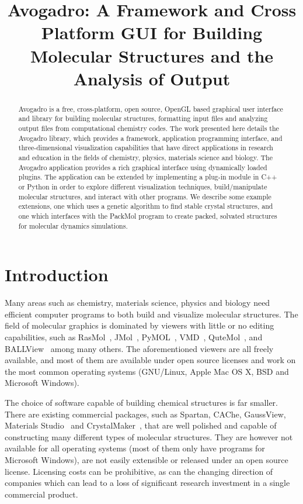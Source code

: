 \documentclass{article}
\title{Avogadro: A Framework and Cross Platform GUI for Building Molecular Structures and the Analysis of Output}
\begin{document}
\maketitle

\begin{abstract}

Avogadro is a free, cross-platform, open source, OpenGL based graphical user
interface and library for building molecular structures, formatting input files
and analyzing output files from computational chemistry codes. The work
presented here details the Avogadro library, which provides a framework,
application programming interface, and three-dimensional visualization
capabilities that have direct applications in research and education in the
fields of chemistry, physics, materials science and biology. The Avogadro
application provides a rich graphical interface using dynamically loaded plugins.
The application can be extended by implementing a plug-in module in C++ or Python in
order to explore different visualization techniques, build/manipulate molecular
structures, and interact with other programs.
We describe some example extensions, one which uses a genetic algorithm to find
stable crystal structures, and one which interfaces with the PackMol program to
create packed, solvated structures for molecular dynamics simulations.

\end{abstract}

\section{Introduction}

Many areas such as chemistry, materials science, physics and biology need efficient computer programs to both build and visualize molecular structures. The field of molecular graphics is dominated by viewers with little or no editing capabilities, such as RasMol~\cite{RasMol}, JMol~\cite{JMol}, PyMOL~\cite{PyMOL}, VMD~\cite{VMD}, QuteMol~\cite{QuteMol}, and BALLView~\cite{BALLView} among many others. The aforementioned viewers are all freely available, and most of them are available under open source licenses and work on the most common operating systems (GNU/Linux, Apple Mac OS X, BSD and Microsoft Windows).

The choice of software capable of building chemical structures is far smaller. There are existing commercial packages, such as Spartan, CAChe, GaussView, Materials Studio~\cite{Accelrys} and CrystalMaker~\cite{CrystalMaker}, that are well polished and capable of constructing many different types of molecular structures. They are however not available for all operating systems (most of them only have programs for Microsoft Windows), are not easily extensible or released under an open source license. Licensing costs can be prohibitive, as can the changing direction of companies which can lead to a loss of significant research investment in a single commercial product.
\end{document}
